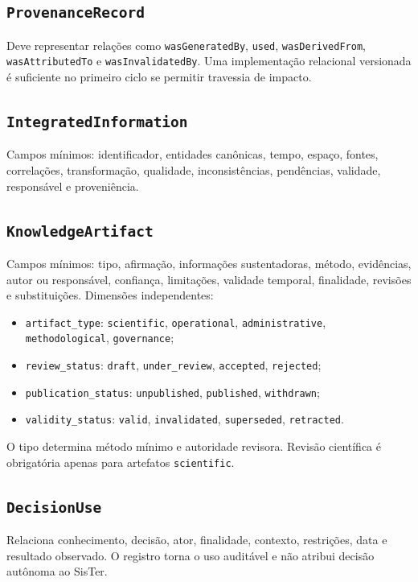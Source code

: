 \documentclass[11pt,a4paper,oneside]{article}
\begin{document}
\subsection{\texttt{ProvenanceRecord}}
Deve representar relações como \texttt{wasGeneratedBy}, \texttt{used}, \texttt{wasDerivedFrom}, \texttt{wasAttributedTo} e \texttt{wasInvalidatedBy}. Uma implementação relacional versionada é suficiente no primeiro ciclo se permitir travessia de impacto.

\subsection{\texttt{IntegratedInformation}}
Campos mínimos: identificador, entidades canônicas, tempo, espaço, fontes, correlações, transformação, qualidade, inconsistências, pendências, validade, responsável e proveniência.

\subsection{\texttt{KnowledgeArtifact}}
Campos mínimos: tipo, afirmação, informações sustentadoras, método, evidências, autor ou responsável, confiança, limitações, validade temporal, finalidade, revisões e substituições. Dimensões independentes:
\begin{itemize}
  \item \texttt{artifact\_type}: \texttt{scientific}, \texttt{operational}, \texttt{administrative}, \texttt{methodological}, \texttt{governance};
  \item \texttt{review\_status}: \texttt{draft}, \texttt{under\_review}, \texttt{accepted}, \texttt{rejected};
  \item \texttt{publication\_status}: \texttt{unpublished}, \texttt{published}, \texttt{withdrawn};
  \item \texttt{validity\_status}: \texttt{valid}, \texttt{invalidated}, \texttt{superseded}, \texttt{retracted}.
\end{itemize}
O tipo determina método mínimo e autoridade revisora. Revisão científica é obrigatória apenas para artefatos \texttt{scientific}.

\subsection{\texttt{DecisionUse}}
Relaciona conhecimento, decisão, ator, finalidade, contexto, restrições, data e resultado observado. O registro torna o uso auditável e não atribui decisão autônoma ao SisTer.
\end{document}
